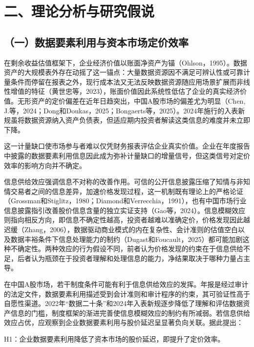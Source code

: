 \section{二、理论分析与研究假说}\label{ux4e8cux7406ux8bbaux5206ux6790ux4e0eux7814ux7a76ux5047ux8bf4}

\subsection{（一）数据要素利用与资本市场定价效率}\label{ux4e00ux6570ux636eux8981ux7d20ux5229ux7528ux4e0eux8d44ux672cux5e02ux573aux5b9aux4ef7ux6548ux7387}

在剩余收益估值框架下，企业经济价值以账面净资产为锚（Ohlson，1995）。数据资产的大规模表外存在动摇了这一锚点：大量数据资源因不满足可辨认性或可靠计量条件而停留在报表之外，现行成本法又无法反映数据资源随应用场景扩展而非线性增值的特征（黄世忠等，2023），账面价值因此系统性低估了企业的真实经济价值。无形资产的定价偏差在近年日趋突出，中国A股市场的偏差尤为明显（Chen, J.等，2024；Dong和Doukas，2025；Bongaerts等，2025）。2024年施行的入表新规虽将数据资源纳入资产负债表，但适应期内投资者解读这类信息的难度并未立即下降。

这一计量缺口使市场参与者难以仅凭财务报表评估企业真实价值。企业在年度报告中披露的数据要素利用信息因此成为弥补计量缺口的增量信号，但这类信号对定价效率的影响方向并不确定。

信息供给效应强调信息不对称的改善作用。可信的公开信息披露压缩了知情与非知情交易者之间的信息差异，加速价格发现过程，这一机制既有理论上的严格论证（Grossman和Stiglitz，1980；Diamond和Verrecchia，1991），也有中国市场行业信息披露指引改善股价信息含量的独立实证支持（Gao等，2024）。信息模糊效应则指向相反方向，即信息不确定性越高，投资者越难以准确定价，价格发现因此越迟缓（Zhang，2006），数据驱动商业模式的内在复杂性、会计准则的估值空白以及数据丰裕条件下信息处理能力的制约（Dugast和Foucault，2025）都可能加剧这种不确定性。两种效应的行为假设不同，前者认为价格发现的约束在于信息供给不足，后者认为瓶颈在于投资者理解和处理信息的能力，净结果取决于哪种力量占主导。

在中国A股市场，若干制度条件可能有利于信息供给效应的发挥。年报是经过审计的法定文件，数据要素利用描述受到会计准则和审计程序的约束，其可验证性高于自愿性渠道。2022年``数据二十条''和2024年入表新规逐步降低了理解和评估数据资产信息的门槛，制度框架的渐进完善使信息模糊效应的制约有所减弱。若信息供给效应占优，应观察到企业数据要素利用与股价延迟呈显著负向关联。据此提出：

H1：企业数据要素利用降低了资本市场的股价延迟，即提升了定价效率。


